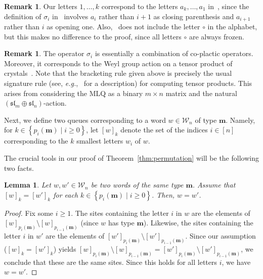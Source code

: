 \documentclass[reqno]{amsart}
\newcommand{\0}{\phantom{c}}
\newcommand{\mm}{\mathbf{m}}
\newcommand{\mcW}{\mathcal{W}}
\newenvironment{verlong}{}{}
\newcommand{\set}[1]{\left\{ #1 \right\}}
\newcommand{\ive}[1]{\left[ #1 \right]}
\theoremstyle{plain}
\newtheorem{lemma}[thm]{Lemma}
\theoremstyle{definition}
\newtheorem{remark}[thm]{Remark}
\numberwithin{equation}{section}
\begin{document}
\begin{verlong}
\begin{remark}
Our letters $1, \ldots, k$ correspond to the letters
$a_k, \ldots, a_1$ in~\cite{Loth},
since the definition of $\sigma_i$ in~\cite{Loth} involves $a_i$ rather
than $i+1$ as closing parenthesis and $a_{i+1}$ rather than $i$ as opening one.
Also,~\cite{Loth} does not include the letter $\circ$ in the alphabet,
but this makes no difference to the proof, since all letters $\circ$ are always frozen.
\end{remark}

\begin{remark}
The operator $\sigma_i$ is essentially a combination of co-plactic operators.
Moreover, it corresponds to the Weyl group action on a tensor product of crystals~\cite{BS17}.
Note that the bracketing rule given above is precisely the usual signature rule (see, \textit{e.g.},~\cite[Sec.~2.4]{BS17} for a description) for computing tensor products.
This arises from considering the MLQ as a binary $m \times n$ matrix and the natural $(\mathfrak{sl}_m \oplus \mathfrak{sl}_n)$-action.
\end{remark}

Next, we define two queues corresponding to a word $w \in \mcW_n$ of type $\mm$.
Namely, for $k \in \set{p_i(\mm) \mid i \geq 0}$, let $[w]_k$ denote the set of the indices $i \in \ive{n}$
corresponding to the $k$ smallest letters $w_i$ of $w$.

The crucial tools in our proof of Theorem~\ref{thm:permutation} will be the following two facts.

\begin{lemma} \label{lem:SL.reconstruct-old6}
Let $w, w' \in \mcW_n$ be two words of the same type $\mm$.
Assume that $[w]_k = [w']_k$ for each $k \in \set{p_i(\mm) \mid i \geq 0}$.
Then, $w = w'$.
\end{lemma}

\begin{proof}
Fix some $i \geq 1$.
The sites containing the letter $i$ in $w$ are the elements of $[w]_{p_i(\mm)} \setminus [w]_{p_{i-1}(\mm)}$
(since $w$ has type $\mm$).
Likewise,
the sites containing the letter $i$ in $w'$ are the elements of $[w']_{p_i(\mm)} \setminus [w']_{p_{i-1}(\mm)}$.
Since our assumption ($[w]_k = [w']_k$) yields $[w]_{p_i(\mm)} \setminus [w]_{p_{i-1}(\mm)}
= [w']_{p_i(\mm)} \setminus [w']_{p_{i-1}(\mm)}$,
we conclude that these are the same sites.
Since this holds for all letters $i$, we have $w = w'$.
\end{proof}


\end{verlong}
\end{document}
